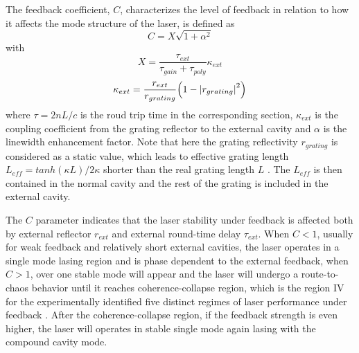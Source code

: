 The feedback coefficient, $C$, characterizes the level of feedback in relation to how it affects the mode structure of the laser, is defined as
\begin{equation}
    C=X\sqrt{1+\alpha^2}
\end{equation}
with
\begin{equation}
    X=\frac{\tau_{ext}}{\tau_{gain}+\tau_{poly}}\kappa_{ext}
\end{equation}
\begin{equation}
    \kappa_{ext}=\frac{r_{ext}}{r_{grating}}\qty(1-\abs{r_{grating}}^2)
\end{equation}
where $\tau=2nL/c$ is the roud trip time in the corresponding section, $\kappa_{ext}$ is the coupling coefficient from the grating reflector to the external cavity and $\alpha$ is the linewidth enhancement factor. Note that here the grating reflectivity $r_{grating}$ is considered as a static value, which leads to effective grating length $L_{eff}=tanh(\kappa L)/2\kappa$ shorter than the real grating length $L$ \cite{kuznetsov1988theory}. The $L_{eff}$ is then contained in the normal cavity and the rest of the grating is included in the external cavity.

The $C$ parameter indicates that the laser stability under feedback is affected both by external reflector $r_{ext}$ and external round-time delay $\tau_{ext}$. When $C<1$, usually for weak feedback and relatively short external cavities, the laser operates in a single mode lasing region and is phase dependent to the external feedback, when $C>1$, over one stable mode will appear and the laser will undergo a route-to-chaos behavior until it reaches coherence-collapse \cite{lenstra1985coherence} region, which is the region IV for the experimentally identified five distinct regimes of laser performance under feedback \cite{tkach1986regimes}. After the coherence-collapse region, if the feedback strength is even higher, the laser will operates in stable single mode again lasing with the compound cavity mode.


